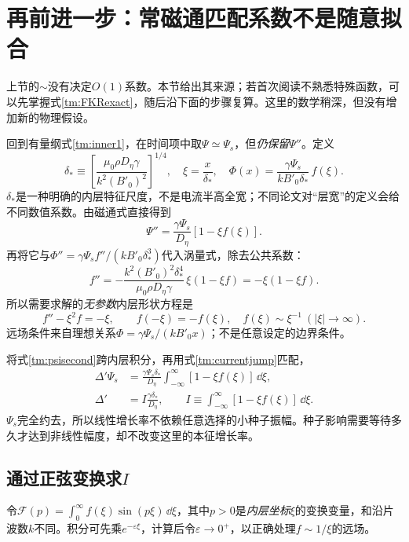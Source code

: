 \section{再前进一步：常磁通匹配系数不是随意拟合}
上节的$\sim$没有决定$O(1)$系数。本节给出其来源；若首次阅读不熟悉特殊函数，可以先掌握式\eqref{tm:FKRexact}，随后沿下面的步骤复算。这里的数学稍深，但没有增加新的物理假设。

回到有量纲式\eqref{tm:inner1}，在时间项中取$\Psi\simeq\Psi_s$，但\emph{仍保留}$\Psi''$。定义
\begin{equation}
 \delta_*\equiv\left[\frac{\mu_0\rho D_\eta\gamma}{k^2(B'_0)^2}\right]^{1/4},
 \quad \xi=\frac{x}{\delta_*},\quad
 \Phi(x)=\frac{\gamma\Psi_s}{kB'_0\delta_*}\,f(\xi).
 \label{tm:deltastar}
\end{equation}
$\delta_*$是一种明确的内层特征尺度，不是电流半高全宽；不同论文对“层宽”的定义会给不同数值系数。由磁通式直接得到
\begin{equation}
 \Psi''=\frac{\gamma\Psi_s}{D_\eta}[1-\xi f(\xi)].
 \label{tm:psisecond}
\end{equation}
再将它与$\Phi''=\gamma\Psi_s f''/(kB'_0\delta_*^3)$代入涡量式，除去公共系数：
\begin{equation}
 f''=-\frac{k^2(B'_0)^2\delta_*^4}{\mu_0\rho D_\eta\gamma}\,\xi(1-\xi f)
 =-\xi(1-\xi f).
\end{equation}
所以需要求解的\emph{无参数}内层形状方程是
\begin{equation}
 \boxed{f''-\xi^2f=-\xi,\qquad f(-\xi)=-f(\xi),\quad
 f(\xi)\sim\xi^{-1}\ (|\xi|\to\infty).}
 \label{tm:shapeODE}
\end{equation}
远场条件来自理想关系$\Phi=\gamma\Psi_s/(kB'_0x)$；不是任意设定的边界条件。

将式\eqref{tm:psisecond}跨内层积分，再用式\eqref{tm:currentjump}匹配，
\begin{align}
 \Delta'\Psi_s&=\frac{\gamma\Psi_s\delta_*}{D_\eta}
 \int_{-\infty}^{\infty}[1-\xi f(\xi)]\,\dd\xi,\\
 \Delta'&=I\frac{\gamma\delta_*}{D_\eta},\qquad
 I\equiv\int_{-\infty}^{\infty}[1-\xi f(\xi)]\,\dd\xi.
 \label{tm:matchI}
\end{align}
$\Psi_s$完全约去，所以线性增长率不依赖任意选择的小种子振幅。种子影响需要等待多久才达到非线性幅度，却不改变这里的本征增长率。

\subsection{通过正弦变换求\texorpdfstring{$I$}{I}}
令$\mathcal F(p)=\int_0^\infty f(\xi)\sin(p\xi)\,\dd\xi$，其中$p>0$是\emph{内层坐标}$\xi$的变换变量，和沿片波数$k$不同。积分可先乘$e^{-\varepsilon\xi}$，计算后令$\varepsilon\to0^+$，以正确处理$f\sim1/\xi$的远场。


